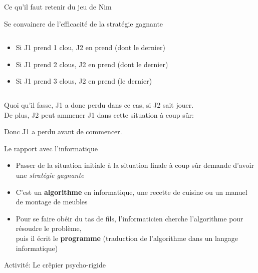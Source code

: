 \documentclass[final,hyperref={pdfpagelabels=false}]{beamer}
\renewenvironment{Coupe}{   }{   }
\begin{document}
\begin{Coupe}
\begin{frame}{Ce qu'il faut retenir du jeu de Nim}
\begin{block}{Se convaincre de l'efficacité de la stratégie gagnante}
    \vspace{-\baselineskip}
    \begin{columns}
      \begin{column}{.55\linewidth}
        \begin{itemize}
        \item Si J1 prend \alert{1} clou, J2 en prend  (dont le dernier) 
        \item Si J1 prend \alert{2} clous, J2 en prend  (dont le dernier)
        \item Si J1 prend \alert{3} clous, J2 en prend  (le dernier) 
        \end{itemize}        
      \end{column}      
      \begin{column}{.35\linewidth}
        
      \end{column}
    \end{columns}

    \vspace{-.5\baselineskip}
    Quoi qu'il fasse, J1 a donc perdu dans ce cas, si J2 sait jouer. \\[\baselineskip]
    De plus, J2 peut ammener J1 dans cette situation à coup sûr:
    
    Donc J1 a perdu avant de commencer.
  \end{block}

  \begin{block}{Le rapport avec l'informatique}
    \begin{itemize}
    \item Passer de la situation initiale à la situation finale à coup sûr demande d'avoir
      une \textit{stratégie gagnante}
    \item C'est un \alert{\textbf{algorithme}} en informatique, une recette de
      cuisine ou un manuel de montage de meubles
    \item Pour se faire obéir du tas de fils, l'informaticien cherche
      l'algorithme pour résoudre le problème,\\
      puis il écrit le \alert{\textbf{programme}} (traduction de l'algorithme
      dans un langage informatique)
    \end{itemize}
  \end{block}
\end{frame}
\begin{frame}{Activité: Le crêpier psycho-rigide}


\end{frame}
\end{Coupe}
\end{document}
